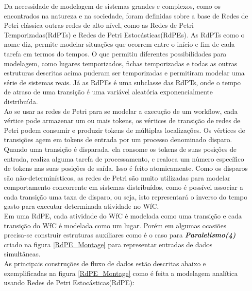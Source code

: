 \documentclass[a4paper,10pt]{article}
\begin{document}
Da necessidade de modelagem de sistemas grandes e complexos, como os encontrados na natureza e na sociedade, foram definidas sobre a base de Redes de Petri clássica outras redes de alto nível, como as Redes de Petri Temporizadas(RdPTs) e Redes de Petri Estocásticas(RdPEs). As RdPTs como o nome diz, permite modelar situações que ocorrem entre o início e fim de cada tarefa em termos do tempos. O que permitiu diferentes possibilidades para modelagem, como lugares temporizados, fichas temporizadas e todas as outras estruturas descritas acima puderam ser temporizadas e permitiram modelar uma série de sistemas reais. Já as RdPEs é uma subclasse das RdPTs, onde o tempo de atraso de uma transição é uma variável aleatória exponencialmente distribuída\cite{Braghetto2011}. \\
		
	Ao se usar as redes de Petri para se modelar a execução de um workflow, cada vértice pode armazenar um ou mais tokens, os vértices de transição de redes de Petri podem consumir e produzir tokens de múltiplas localizações. Os vértices de transições agem em tokens de entrada por um processo denominado disparo. Quando uma transição é disparada, ela consome os tokens de suas posições de entrada, realiza alguma tarefa de processamento, e realoca um número específico de tokens nas suas posições de saída. Isso é feito atomicamente. Como os disparos são não-determinísticos, as redes de Petri são muito utilizadas para modelar comportamento concorrente em sistemas distribuídos\cite{Ogasawara2011}, como é possível associar a cada transição uma taxa de disparo, ou seja, isto representará o inverso do tempo gasto para executar determinada atividade no WfC.\\
	
	Em uma RdPE, cada atividade do WfC é modelada como uma transição e cada transição do WfC é modelada como um lugar. Porém em algumas ocasiões precisa-se construir estruturas auxiliares como é o caso para \textit{\textbf{Paralelismo(4)}} criado na figura \ref{RdPE_Montage} para representar entradas de dados simultâneas.	\\


		As principais construções de fluxo de dados estão descritas abaixo e exemplificadas na figura \ref{RdPE_Montage} como é feita a modelagem analítica usando Redes de Petri Estocásticas(RdPE):
		
\end{document}
